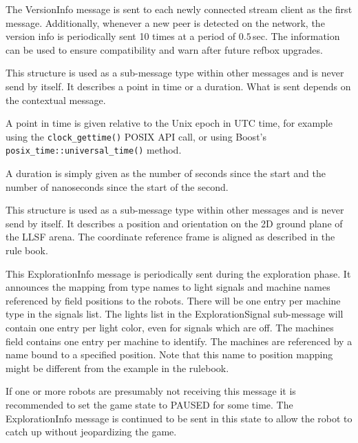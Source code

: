 \documentclass[a4paper]{article}
\begin{document}
%
{%
  The VersionInfo message is sent to each newly connected stream
  client as the first message. Additionally, whenever a new peer is
  detected on the network, the version info is periodically sent 10
  times at a period of $0.5$\,sec. The information can be used to
  ensure compatibility and warn after future refbox upgrades.
}

%
{%
  This structure is used as a sub-message type within other messages
  and is never send by itself. It describes a point in time or a
  duration. What is sent depends on the contextual message.

  \smallskip

  A point in time is given relative to the Unix epoch in UTC time, for
  example using the \texttt{clock\_gettime()} POSIX API call, or using
  Boost's \texttt{posix\_time::universal\_time()} method.

  A duration is simply given as the number of seconds since the start
  and the number of nanoseconds since the start of the second.
}

%
{%
  This structure is used as a sub-message type within other messages
  and is never send by itself. It describes a position and orientation
  on the 2D ground plane of the LLSF arena. The coordinate reference
  frame is aligned as described in the rule book.
}

%
{%
  This ExplorationInfo message is periodically sent during the
  exploration phase. It announces the mapping from type names to light
  signals and machine names referenced by field positions to the
  robots. There will be one entry per machine type in the signals
  list. The lights list in the ExplorationSignal sub-message will
  contain one entry per light color, even for signals which are
  off. The machines field contains one entry per machine to
  identify. The machines are referenced by a name bound to a specified
  position. Note that this name to position mapping might be different
  from the example in the rulebook.

  \medskip
  If one or more robots are presumably not receiving this message it
  is recommended to set the game state to PAUSED for some time. The
  ExplorationInfo message is continued to be sent in this state to
  allow the robot to catch up without jeopardizing the game.
}
\end{document}
